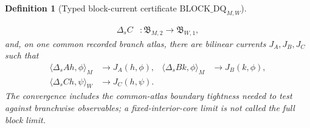 \documentclass[11pt]{article}
\newtheorem{definition}[theorem]{Definition}
\begin{document}
\begin{definition}[Typed block-current certificate
$\mathrm{BLOCK\_DQ}_{M,W}$]
\begin{enumerate}[label=\textup{(BD\arabic*)}]
\begin{equation}
\begin{split}
       \Delta_sC&:\mathfrak B_{M,2}\to\mathfrak B_{W,1},
      \end{split}
      \end{equation}
      and, on one common recorded branch atlas, there are bilinear currents
      $J_A,J_B,J_C$ such that
      \begin{align}
       \langle\Delta_sAh,\phi\rangle_M&\longrightarrow J_A(h,\phi),
       &\langle\Delta_sBk,\phi\rangle_M&\longrightarrow J_B(k,\phi),
       \label{eq:fixed-section-block-DQ-limits}\\
       \langle\Delta_sCh,\psi\rangle_W&\longrightarrow J_C(h,\psi).
       \nonumber
      \end{align}
      The convergence includes the common-atlas boundary tightness needed to
      test against branchwise observables; a fixed-interior-core limit is not
      called the full block limit.
\end{enumerate}
\end{definition}
\end{document}
